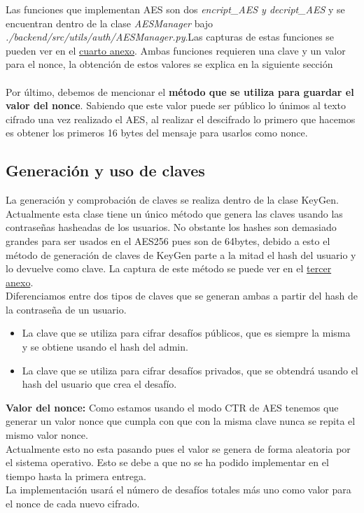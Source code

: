 \documentclass[a4paper,11pt]{article}
\begin{document}
Las funciones que implementan AES son dos \textit{encript\_AES y decript\_AES} y se encuentran dentro de la clase \textit{AESManager} bajo \textit{./backend/src/utils/auth/AESManager.py}.Las capturas de estas funciones se pueden ver en el \hyperref[sec:funcionesAES]{cuarto anexo}. Ambas funciones requieren una clave y un valor para el nonce, la obtención de estos valores se explica en la siguiente sección \\\\
Por último, debemos de mencionar el \textbf{método que se utiliza para guardar el valor del nonce}. Sabiendo  que este valor puede ser público lo únimos al texto cifrado una vez realizado el AES, al realizar el descifrado lo primero que hacemos es obtener los primeros 16 bytes del mensaje para usarlos como nonce. 

\subsection{Generación y uso de claves}
\label{sec:generacionUsoDeClaves}
La generación y comprobación de claves se realiza dentro de la clase KeyGen. Actualmente esta clase tiene un único método que genera las claves usando las contraseñas hasheadas de los usuarios. No obstante los hashes son demasiado grandes para ser usados en el AES256 pues son de 64bytes, debido a esto el método de generación de claves de KeyGen parte a la mitad el hash del usuario y lo devuelve como clave. La captura de este método se puede ver en el \hyperref[sec:funcionesKeyGen]{tercer anexo}. \\

Diferenciamos entre dos tipos de claves que se generan ambas a partir del hash de la contraseña de un usuario. 
\begin{itemize}
\item La clave que se utiliza para cifrar desafíos públicos, que es siempre la misma y se obtiene usando el hash del admin.
\item La clave que se utiliza para cifrar desafíos privados, que se obtendrá usando el hash del usuario que crea el desafío.
\end{itemize}


\textbf{Valor del nonce:} Como estamos usando el modo CTR de AES tenemos que generar un valor nonce que cumpla con que con la misma clave nunca se repita el mismo valor nonce. \\ 
Actualmente esto no esta pasando pues el valor se genera de forma aleatoria por el sistema operativo. Esto se debe a que no se ha podido implementar en el tiempo hasta la primera entrega.\\
La implementación usará el número de desafíos totales más uno como valor para el nonce de cada nuevo cifrado. \\ 
\end{document}
